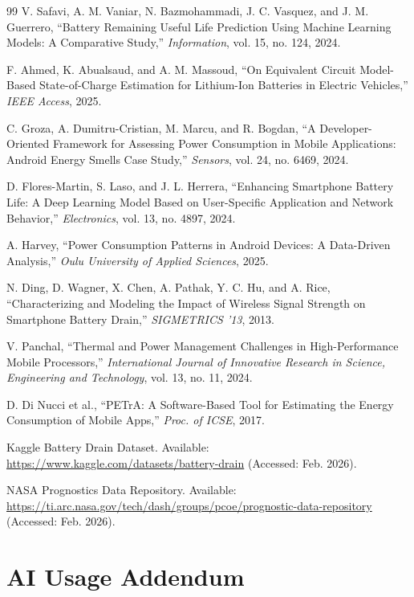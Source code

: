\documentclass[12pt]{article}
\begin{document}
\begin{thebibliography}{99}
V. Safavi, A. M. Vaniar, N. Bazmohammadi, J. C. Vasquez, and J. M. Guerrero, ``Battery Remaining Useful Life Prediction Using Machine Learning Models: A Comparative Study,'' \textit{Information}, vol. 15, no. 124, 2024.

F. Ahmed, K. Abualsaud, and A. M. Massoud, ``On Equivalent Circuit Model-Based State-of-Charge Estimation for Lithium-Ion Batteries in Electric Vehicles,'' \textit{IEEE Access}, 2025.

C. Groza, A. Dumitru-Cristian, M. Marcu, and R. Bogdan, ``A Developer-Oriented Framework for Assessing Power Consumption in Mobile Applications: Android Energy Smells Case Study,'' \textit{Sensors}, vol. 24, no. 6469, 2024.

D. Flores-Martin, S. Laso, and J. L. Herrera, ``Enhancing Smartphone Battery Life: A Deep Learning Model Based on User-Specific Application and Network Behavior,'' \textit{Electronics}, vol. 13, no. 4897, 2024.

A. Harvey, ``Power Consumption Patterns in Android Devices: A Data-Driven Analysis,'' \textit{Oulu University of Applied Sciences}, 2025.

N. Ding, D. Wagner, X. Chen, A. Pathak, Y. C. Hu, and A. Rice, ``Characterizing and Modeling the Impact of Wireless Signal Strength on Smartphone Battery Drain,'' \textit{SIGMETRICS '13}, 2013.

V. Panchal, ``Thermal and Power Management Challenges in High-Performance Mobile Processors,'' \textit{International Journal of Innovative Research in Science, Engineering and Technology}, vol. 13, no. 11, 2024.

D. Di Nucci et al., ``PETrA: A Software-Based Tool for Estimating the Energy Consumption of Mobile Apps,'' \textit{Proc. of ICSE}, 2017.

Kaggle Battery Drain Dataset. Available: \url{https://www.kaggle.com/datasets/battery-drain} (Accessed: Feb. 2026).

NASA Prognostics Data Repository. Available: \url{https://ti.arc.nasa.gov/tech/dash/groups/pcoe/prognostic-data-repository} (Accessed: Feb. 2026).

\end{thebibliography}

\newpage
\setcounter{page}{1}
\section*{AI Usage Addendum}
\end{document}
